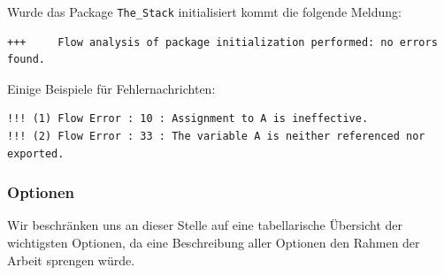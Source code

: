 Wurde das Package \texttt{The\_Stack} initialisiert kommt die folgende Meldung:

\begin{verbatim}
+++		Flow analysis of package initialization performed: no errors found.
\end{verbatim}

Einige Beispiele für Fehlernachrichten:
\begin{verbatim}
!!! (1)	Flow Error : 10 : Assignment to A is ineffective.
!!! (2) Flow Error : 33 : The variable A is neither referenced nor exported.
\end{verbatim}

\subsubsection{Optionen}
Wir beschränken uns an dieser Stelle auf eine tabellarische Übersicht der wichtigsten Optionen, da eine Beschreibung aller Optionen den Rahmen der Arbeit sprengen würde.

